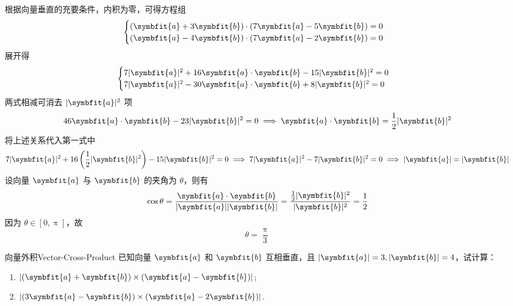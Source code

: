 \begin{solution}
    根据向量垂直的充要条件，内积为零，可得方程组
    \begin{equation*}
        \begin{cases}
            (\symbfit{a} + 3\symbfit{b}) \cdot (7\symbfit{a} - 5\symbfit{b}) = 0 \\
            (\symbfit{a} - 4\symbfit{b}) \cdot (7\symbfit{a} - 2\symbfit{b}) = 0
        \end{cases}
    \end{equation*}
    展开得
    \begin{equation*}
        \begin{cases}
            7|\symbfit{a}|^2 + 16\symbfit{a} \cdot \symbfit{b} - 15|\symbfit{b}|^2 = 0 \\
            7|\symbfit{a}|^2 - 30\symbfit{a} \cdot \symbfit{b} + 8|\symbfit{b}|^2 = 0
        \end{cases}
    \end{equation*}
    两式相减可消去 $|\symbfit{a}|^2$ 项
    \begin{equation*}
        46\symbfit{a} \cdot \symbfit{b} - 23|\symbfit{b}|^2 = 0 \implies \symbfit{a} \cdot \symbfit{b} = \frac{1}{2}|\symbfit{b}|^2
    \end{equation*}
    将上述关系代入第一式中
    \begin{equation*}
        7|\symbfit{a}|^2 + 16 \left( \frac{1}{2}|\symbfit{b}|^2 \right) - 15|\symbfit{b}|^2 = 0 \implies 7|\symbfit{a}|^2 - 7|\symbfit{b}|^2 = 0 \implies |\symbfit{a}| = |\symbfit{b}|
    \end{equation*}
    设向量 $\symbfit{a}$ 与 $\symbfit{b}$ 的夹角为 $\theta$，则有
    \begin{equation*}
        \cos \theta = \frac{\symbfit{a} \cdot \symbfit{b}}{|\symbfit{a}||\symbfit{b}|} = \frac{\frac{1}{2}|\symbfit{b}|^2}{|\symbfit{b}|^2} = \frac{1}{2}
    \end{equation*}
    因为 $\theta \in [0, \uppi]$，故
    \begin{equation*}
        \boxed{\theta = \frac{\uppi}{3}}
    \end{equation*}
\end{solution}

\begin{problem}{向量外积}{Vector-Cross-Product}
    已知向量 $\symbfit{a}$ 和 $\symbfit{b}$ 互相垂直，且 $|\symbfit{a}| = 3, |\symbfit{b}| = 4$，试计算：
    \begin{enumerate}
        \item $|(\symbfit{a} + \symbfit{b}) \times (\symbfit{a} - \symbfit{b})|$;
        \item $|(3\symbfit{a} - \symbfit{b}) \times (\symbfit{a} - 2\symbfit{b})|$.
    \end{enumerate}
\end{problem}

